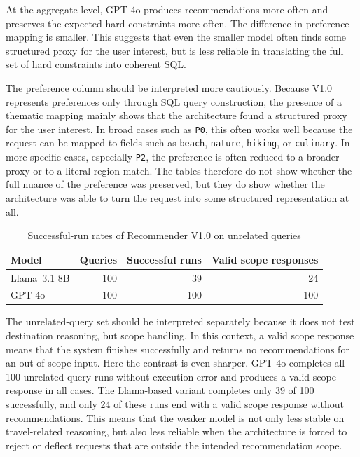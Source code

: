 At the aggregate level, GPT-4o produces recommendations more often and preserves the expected hard constraints more often. The difference in preference mapping is smaller. This suggests that even the smaller model often finds some structured proxy for the user interest, but is less reliable in translating the full set of hard constraints into coherent SQL.

The preference column should be interpreted more cautiously. Because V1.0 represents preferences only through SQL query construction, the presence of a thematic mapping mainly shows that the architecture found a structured proxy for the user interest. In broad cases such as \texttt{P0}, this often works well because the request can be mapped to fields such as \texttt{beach}, \texttt{nature}, \texttt{hiking}, or \texttt{culinary}. In more specific cases, especially \texttt{P2}, the preference is often reduced to a broader proxy or to a literal region match. The tables therefore do not show whether the full nuance of the preference was preserved, but they do show whether the architecture was able to turn the request into some structured representation at all.

\begin{table}[htbp]
\centering
\begin{tabular}{lrrr}
\hline
Model & Queries & Successful runs & Valid scope responses \\
\hline
Llama~3.1 8B & 100 & 39 & 24 \\
GPT-4o & 100 & 100 & 100 \\
\hline
\end{tabular}
\caption{Successful-run rates of Recommender V1.0 on unrelated queries}
\label{table:recommendation-generation:v1-0-unrelated-success}
\end{table}

The unrelated-query set should be interpreted separately because it does not test destination reasoning, but scope handling. In this context, a valid scope response means that the system finishes successfully and returns no recommendations for an out-of-scope input. Here the contrast is even sharper. GPT-4o completes all 100 unrelated-query runs without execution error and produces a valid scope response in all cases. The Llama-based variant completes only 39 of 100 successfully, and only 24 of these runs end with a valid scope response without recommendations. This means that the weaker model is not only less stable on travel-related reasoning, but also less reliable when the architecture is forced to reject or deflect requests that are outside the intended recommendation scope.


